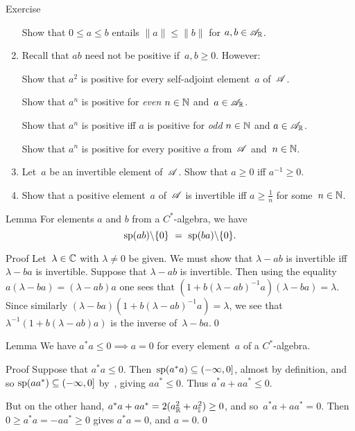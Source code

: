 \documentclass[a]{subfiles}
\begin{document}
\begin{parsec}
\begin{point}{Exercise}
\begin{enumerate}
Show that $0\leq a \leq b$ entails $\|a\|\leq \|b\|$
for $a,b\in\mathscr{A}_{\mathbb{R}}$.

\item 
Recall that $ab$ need not be positive if~$a,b\geq 0$. However:

Show that $a^2$ is positive for every self-adjoint element~$a$ of~$\mathscr{A}$.

Show that $a^n$ is positive for \emph{even} $n\in \mathbb{N}$ and~$a\in\mathscr{A}_{\mathbb{R}}$.

Show that $a^n$ is positive iff $a$ is positive for \emph{odd} $n\in \mathbb{N}$
and $a\in\mathscr{A}_{\mathbb{R}}$.

Show that $a^n$ is positive
for every positive $a$ from~$\mathscr{A}$ and~$n\in \mathbb{N}$.
\item
Let~$a$ be an invertible element of~$\mathscr{A}$.
Show that $a\geq 0$ iff $a^{-1}\geq 0$.

\item
Show that a positive element~$a$ of~$\mathscr{A}$ is invertible
iff $a\geq \frac{1}{n}$ for some~$n\in \mathbb{N}$.
\end{enumerate}
\end{point}
\begin{point}{Lemma}%
For elements $a$ and $b$ from a $C^*$-algebra,
we have
\begin{equation*}
\spec(ab)\backslash\{0\}\ =\ \spec(ba)\backslash\{0\}.
\end{equation*}
\begin{point}{Proof}%
Let~$\lambda\in \mathbb{C}$ with $\lambda\neq 0$ be given.
We must show that $\lambda - ab$ is invertible
iff $\lambda - ba$ is invertible.
Suppose that $\lambda-ab$ is invertible.
Then using the equality$a(\lambda-ba)=(\lambda-ab)a$
one sees that $(1+b(\lambda-ab)^{-1}a)(\lambda-ba)=\lambda$.
Since similarly $(\lambda-ba)(1+b(\lambda-ab)^{-1}a)=\lambda$,
we see that $\lambda^{-1}(1+b(\lambda-ab)a)$
is the inverse of~$\lambda-ba$.\qed
\end{point}
\end{point}
\begin{point}{Lemma}%
We have $a^*a  \leq 0\implies a=0$
for every element~$a$ of a $C^*$-algebra.
\begin{point}{Proof}%
Suppose that $a^*a\leq 0$.
Then~$\mathrm{sp}(a^*a)\subseteq (-\infty,0]$, almost by definition,
and so $\mathrm{sp}(aa^*)\subseteq (-\infty,0]$ by~,
giving $aa^*\leq 0$.
Thus $a^*a+aa^*\leq 0$.

But on the other hand, 
$a^*a+aa^* = 2(a_{\mathbb{R}}^2 + a_{\mathbb{I}}^2) \geq 0$,
and so~$a^*a+aa^*=0$.
Then $0\geq a^*a=-aa^*\geq 0$ gives $a^*a=0$,
and $a=0$.\qed
\end{point}
\end{point}
\end{parsec}
\end{document}
